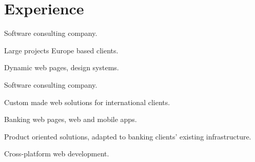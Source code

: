 \documentclass[]{plushcv}
\begin{document}
\begin{minipage}[t]{0.70\textwidth} 



\section{Experience}

\vspace{\topsep} %
\begin{tightemize}
\sectionsep
\item Software consulting company.
\item Large projects Europe based clients.
\item Dynamic web pages, design systems.  
\end{tightemize}
\sectionsep

\begin{tightemize}
\sectionsep
\item Software consulting company.
\item Custom made web solutions for international clients.
\end{tightemize}
\sectionsep

\begin{tightemize}
\sectionsep
\item Banking web pages, web and mobile apps.
\item Product oriented solutions, adapted to banking clients' existing infrastructure. 
\end{tightemize}
\sectionsep

\begin{tightemize}
\sectionsep
\item Cross-platform web development.
\end{tightemize}
\sectionsep




\end{minipage}
\end{document}
